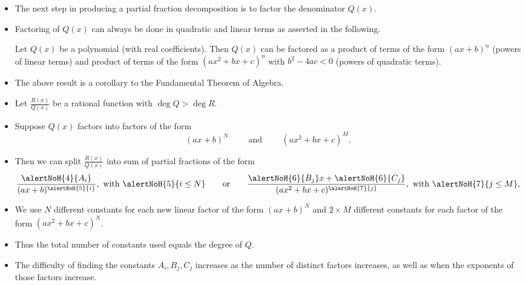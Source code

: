 \begin{frame}
\begin{itemize}
\item The next step in producing a partial fraction decomposition is to factor the denominator $Q(x)$.
\item<2-> Factoring of $Q(x)$ can always be done in quadratic and linear terms as asserted in the following.
\begin{corollary} 
Let $Q(x)$ be a polynomial (with real coefficients). Then $Q(x)$ can be factored as a product of terms of the form $(ax+b)^n$ (powers of linear terms) and product of terms of the form $(ax^2+bx+c)^n$ with $b^2-4ac<0$ (powers of quadratic terms).
\end{corollary}  
\item<3-> The above result is a corollary to the Fundamental Theorem of Algebra. 
\end{itemize}
\end{frame}

\begin{frame}
\begin{itemize}
\item Let $\frac{R(x)}{Q(x)}$ be a rational function with $\deg Q>\deg R$. 
\item<2-> Suppose $Q(x)$ factors into factors of the form 
\[
(ax+b)^N\qquad \text{ and }\qquad (ax^2+bx+c)^M.
\]
\item<3-> Then we can split $\frac{R(x)}{Q(x)}$ into sum of partial fractions of the form 
\[
\frac{\alertNoH{4}{A_i}}{(ax+b)^{\alertNoH{5}{i}}},\text{ with } \alertNoH{5}{i\leq N} \qquad \text{or}\qquad \frac{\alertNoH{6}{B_j}x+\alertNoH{6}{C_j}}{(ax^2+bx+c)^{\alertNoH{7}{j}}}, \text{ with } \alertNoH{7}{j\leq M},
\]
 
\item<8-> We use $N$ different constants for each new linear factor of the form $(ax+b)^N $ and $2\times M$ different constants for each factor of the form $(ax^2+bx+c)^N$. 
\item<9-> Thus the total number of constants used equals the degree of $Q$.

\item<10-> The difficulty of finding the constants $A_i, B_j, C_j$ increases as the number of distinct factors increases, as well as when the exponents of those factors increase.

\end{itemize}



\end{frame}
